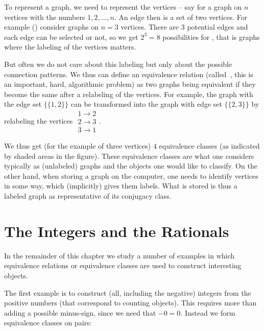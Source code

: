 To represent a graph, we need to represent the vertices -- say for a graph
on $n$ vertices with the numbers $1,2,\ldots,n$. An edge then is a set of
two vertices. For example () consider graphs on $n=3$
vertices. There are 3 potential edges and each edge can be selected or not,
so we get $2^3=8$ possibilities for , that is graphs
where the labeling of the vertices matters.

But often we do not care about this labeling but only  about the possible
connection patterns. We thus can define an equivalence relation
(called~, this is an important, hard, algorithmic
problem)
as two graphs being equivalent if they become the same after a
relabeling of the vertices. For example, the graph with the edge set
$\{\{1,2\}\}$ can be transformed into the graph with edge set $\{\{2,3\}\}$ by
relabeling
the vertices $\begin{array}{c}1\to 2\\2\to3\\3\to1\end{array}$.

We thus get (for the example of three vertices) $4$ equivalence classes
(as indicated by shaded areas in the figure). These equivalence classes are
what one considers typically as (unlabeled) graphs and the objects one would
like to classify. On the other hand, when storing a graph on the computer,
one needs to identify vertices in some way, which (implicitly) gives them
labels. What is stored is thus a labeled graph as representative of its
conjugacy class.

\section{The Integers and the Rationals}

In the remainder of this chapter we study a number of examples in which
equivalence relations or equivalence classes are used to construct
interesting objects.
\smallskip

The first example is to construct (all, including the negative) integers
from the positive numbers (that correspond to counting objects). This
requires more than adding a possible minus-sign, since we need that $-0=0$.
Instead we form equivalence classes on pairs:

